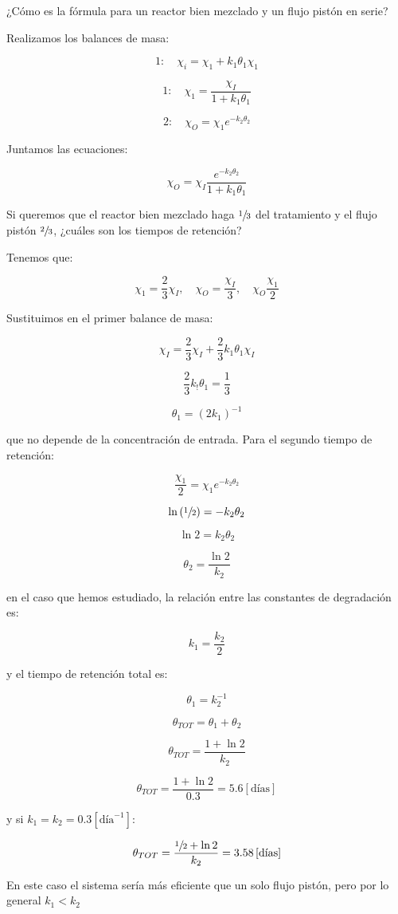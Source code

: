 \documentclass[11pt]{article}
\begin{document}
¿Cómo es la fórmula para un reactor bien mezclado y un flujo pistón en serie?

\bigskip \bigskip

Realizamos los balances de masa:

\[ 1: \quad \chi_i = \chi_1 + k_1 \theta_1 \chi_1 \]

\[ 1: \quad \chi_1 = \frac{ \chi_I }{ 1 + k_1 \theta_1 } \]

\[ 2: \quad \chi_O = \chi_1 e^{-k_2 \theta_2} \]

Juntamos las ecuaciones:

\[ \boxed{ \chi_O = \chi_I \frac{ e^{-k_2 \theta_2} }{ 1 + k_1 \theta_1 } } \]

Si queremos que el reactor bien mezclado haga \( \sfrac{1}{3} \) del tratamiento y el flujo pistón \( \sfrac{2}{3} \), ¿cuáles son los tiempos de retención?

Tenemos que:

\[ \chi_1 = \frac{2}{3} \chi_I , \quad \chi_O = \frac{\chi_I}{3} , \quad \chi_O \frac{\chi_1}{2} \]

Sustituimos en el primer balance de masa:

\[ \chi_I = \frac{2}{3} \chi_I + \frac{2}{3} k_1 \theta_1 \chi_I \]

\[ \frac{2}{3} k_! \theta_1 = \frac{1}{3} \]

\[ \boxed{ \theta_1 = \left( 2 k_1 \right)^{-1} } \]

que no depende de la concentración de entrada. Para el segundo tiempo de retención:

\[ \frac{ \chi_1 }{2} = \chi_1 e^{-k_2 \theta_2} \]

\[ \ln \left( \sfrac{1}{2} \right) = -k_2 \theta_2 \]

\[ \ln 2 = k_2 \theta_2 \]

\[ \boxed{ \theta_2 = \frac{\ln 2}{k_2} } \]

en el caso que hemos estudiado, la relación entre las constantes de degradación es:

\[ k_1 = \frac{k_2}{2} \]

y el tiempo de retención total es:

\[ \theta_1 = k_2^{-1} \]

\[ \theta_{TOT} = \theta_1 + \theta_2 \]

\[ \theta_{TOT} = \frac{1 + \ln 2}{k_2} \]

\[ \theta_{TOT} = \frac{1 + \ln 2}{0.3} = 5.6 \left[ \text{días} \right] \]

y si \( k_1 = k_2 = 0.3 \left[ \text{día}^{-1} \right] \):

\[ \theta_{TOT} = \frac{ \sfrac{1}{2} + \ln 2 }{k_2} = 3.58 \left[ \text{días} \right] \]

En este caso el sistema sería más eficiente que un solo flujo pistón, pero por lo general \( k_1 < k_2 \)

\end{document}
